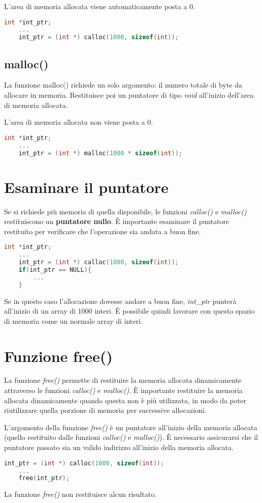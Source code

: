 \documentclass[a4paper,11pt,oneside]{book}
\begin{document}
L'area di memoria allocata viene automaticamente posta a 0.

\begin{lstlisting}[language=C]
    int *int_ptr;
    ... 
    int_ptr = (int *) calloc(1000, sizeof(int));
\end{lstlisting}


\subsection{malloc()}
La funzione malloc() richiede un solo argomento: il numero totale di byte da allocare in memoria. Restituisce poi un puntatore di tipo \emph{void} all'inizio dell'area di 
memoria allocata.

L'area di memoria allocata non viene posta a 0.

\begin{lstlisting}[language=C]
    int *int_ptr;
    ... 
    int_ptr = (int *) malloc(1000 * sizeof(int));
\end{lstlisting}

\section{Esaminare il puntatore}
Se si richiede più memoria di quella disponibile, le funzioni \emph{calloc()} e \emph{malloc()} restituiscono un \textbf{puntatore nullo}.
È importante esaminare il puntatore restituito per verificare che l'operazione sia andata a buon fine.
 
\begin{lstlisting}[language=C]
    int *int_ptr;
    ... 
    int_ptr = (int *) calloc(1000, sizeof(int));
    if(int_ptr == NULL){
        ... 
    }
\end{lstlisting}
Se in questo caso l'allocazione dovesse andare a buon fine, \emph{int\_ptr} punterà all'inizio di un array di 1000 interi. È possibile quindi lavorare con questo 
spazio di memoria come un normale array di interi.

\section{Funzione free()}
La funzione \emph{free()} permette di restituire la memoria allocata dinamicamente attraverso le funzioni \emph{calloc()} e \emph{malloc()}.
È importante restituire la memoria allocata dinamicamente quando questa non è più utilizzata, in modo da poter riutilizzare quella porzione di memoria 
per successive allocazioni.

L'argomento della funzione \emph{free()} è un puntatore all'inizio della memoria allocata (quello restituito dalle funzioni \emph{calloc()} e \emph{malloc()}).
È necessario assicurarsi che il puntatore passato sia un valido indirizzo all'inizio della memoria allocata.

\begin{lstlisting}[language=C]
    int_ptr = (int *) calloc(1000, sizeof(int));
    ... 
    free(int_ptr);
\end{lstlisting}
La funzione \emph{free()} non restituisce alcun risultato.
\end{document}
